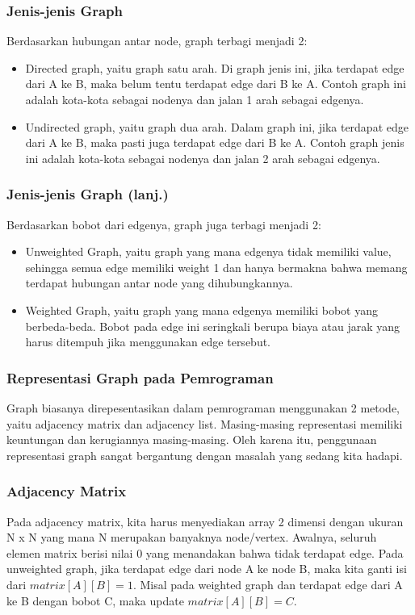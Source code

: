 \begin{frame}
\frametitle{Jenis-jenis Graph}
Berdasarkan hubungan antar node, graph terbagi menjadi 2:
\begin{itemize}
  \item Directed graph, yaitu graph satu arah. Di graph jenis ini, jika terdapat edge dari A ke B, maka belum tentu terdapat edge dari B ke A. Contoh graph ini adalah kota-kota sebagai nodenya dan jalan 1 arah sebagai edgenya.
  \item Undirected graph, yaitu graph dua arah. Dalam graph ini, jika terdapat edge dari A ke B, maka pasti juga terdapat edge dari B ke A. Contoh graph jenis ini adalah kota-kota sebagai nodenya dan jalan 2 arah sebagai edgenya.
\end{itemize}
\end{frame}

\begin{frame}
\frametitle{Jenis-jenis Graph (lanj.)}
Berdasarkan bobot dari edgenya, graph juga terbagi menjadi 2:
\begin{itemize}
  \item Unweighted Graph, yaitu graph yang mana edgenya tidak memiliki value, sehingga semua edge memiliki weight 1 dan hanya bermakna bahwa memang terdapat hubungan antar node yang dihubungkannya.
  \item Weighted Graph, yaitu graph yang mana edgenya memiliki bobot yang berbeda-beda. Bobot pada edge ini seringkali berupa biaya atau jarak yang harus ditempuh jika menggunakan edge tersebut.
\end{itemize}
\end{frame}

\begin{frame}
\frametitle{Representasi Graph pada Pemrograman}

Graph biasanya direpesentasikan dalam pemrograman menggunakan 2 metode, yaitu adjacency matrix dan adjacency list. Masing-masing representasi memiliki keuntungan dan kerugiannya masing-masing. Oleh karena itu, penggunaan representasi graph sangat bergantung dengan masalah yang sedang kita hadapi.
\end{frame}

\begin{frame}
\frametitle{Adjacency Matrix}

Pada adjacency matrix, kita harus menyediakan array 2 dimensi dengan ukuran N x N yang mana N merupakan banyaknya node/vertex. \newline\newline
Awalnya, seluruh elemen matrix berisi nilai 0 yang menandakan bahwa tidak terdapat edge. Pada unweighted graph, jika terdapat edge dari node A ke node B, maka kita ganti isi dari $matrix[A][B] = 1$. Misal pada weighted graph dan terdapat edge dari A ke B dengan bobot C, maka update $matrix[A][B] = C$.
\end{frame}

